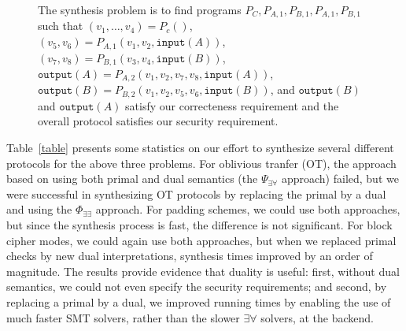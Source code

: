 \documentclass[preprint]{sig-alternate-05-2015}
\begin{document}
\begin{figure}
\centering
{}
\label{fig:example-topology}
\caption{The synthesis problem is to find programs 
$P_C, P_{A,1}, P_{B,1}, P_{A,1}, P_{B,1}$ such that
$(v_1, \ldots, v_4) = P_c()$,
$(v_5, v_6) = P_{A,1}(v_1, v_2, \mathtt{input}(A))$,
$(v_7, v_8) = P_{B,1}(v_3, v_4, \mathtt{input}(B))$,
$\mathtt{output}(A) = P_{A,2}(v_1, v_2, v_7, v_8, \mathtt{input}(A))$,
$\mathtt{output}(B) = P_{B,2}(v_1, v_2, v_5, v_6, \mathtt{input}(B))$,
and $\mathtt{output}(B)$ and $\mathtt{output}(A)$
satisfy our correcteness requirement and the overall
protocol satisfies our security requirement.
}
\end{figure}



Table~\ref{table} presents some statistics on our effort to synthesize 
several different protocols for the above three problems. 
For oblivious tranfer (OT), the approach based on using both primal and dual
semantics (the $\Psi_{\exists\forall}$ approach) failed, but we were 
successful in synthesizing OT protocols by replacing the primal by a dual and
using the $\Phi_{\exists\exists}$ approach. 
For padding schemes, we could use both approaches, but since the synthesis process
is fast, the difference is not significant.
For block cipher modes, we could again use both approaches, but when we replaced
primal checks by new dual interpretations, synthesis times improved by an order
of magnitude.  
The results provide evidence that duality is useful: first, without dual
semantics, we could not even specify the security requirements; and second,
by replacing a primal by a dual, we improved running times by enabling the
use of much faster SMT solvers, rather than
the slower $\exists\forall$ solvers, at the backend.
\end{document}
